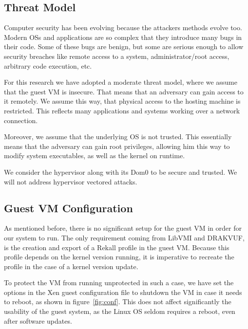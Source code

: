 \subsection{Threat Model}\label{sub:threat}

Computer security has been evolving because the attackers methods evolve too. Modern \ac{OS}s and applications are so complex that they introduce many bugs in their code. Some of these bugs are benign, but some are serious enough to allow security breaches like remote access to a system, administrator/root access, arbitrary code execution, etc. 

\par For this research we have adopted a moderate threat model, where we assume that the guest \ac{VM} is insecure. That means that an adversary can gain access to it remotely. We assume this way, that physical access to the hosting machine is restricted. This reflects many applications and systems working over a network connection.

\par Moreover, we assume that the underlying \ac{OS} is not trusted. This essentially means that the adversary can gain root privileges, allowing him this way to modify system executables, as well as the kernel on runtime.

\par We consider the hypervisor along with its Dom0 to be secure and trusted. We will not address hypervisor vectored attacks.

\subsection{Guest \ac{VM} Configuration}\label{sub:conf}

As mentioned before, there is no significant setup for the guest \ac{VM} in order for our system to run. The only requirement coming from LibVMI and DRAKVUF, is the creation and export of a Rekall profile in the guest \ac{VM}. Because this profile depends on the kernel version running, it is imperative to recreate the profile in the case of a kernel version update. 
\par To protect the \ac{VM} from running unprotected in such a case, we have set the options in the Xen guest configuration file to shutdown the \ac{VM} in case it needs to reboot, as shown in figure~\ref{fig:conf}. This does not affect significantly the usability of the guest system, as the Linux \ac{OS} seldom requires a reboot, even after software updates.

